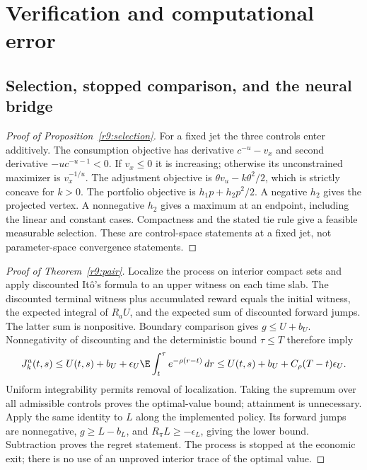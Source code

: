 \section{Verification and computational error}\label{r9:proof:verification}
\subsection{Selection, stopped comparison, and the neural bridge}
\begin{proof}[Proof of Proposition~\ref{r9:selection}]
For a fixed jet the three controls enter additively. The consumption objective has derivative $c^{-u}-v_x$ and second derivative $-uc^{-u-1}<0$. If $v_x\leq0$ it is increasing; otherwise its unconstrained maximizer is $v_x^{-1/u}$. The adjustment objective is $\theta v_u-k\theta^2/2$, which is strictly concave for $k>0$. The portfolio objective is $h_1p+h_2p^2/2$. A negative $h_2$ gives the projected vertex. A nonnegative $h_2$ gives a maximum at an endpoint, including the linear and constant cases. Compactness and the stated tie rule give a feasible measurable selection. These are control-space statements at a fixed jet, not parameter-space convergence statements.
\end{proof}

\begin{proof}[Proof of Theorem~\ref{r9:pair}]
Localize the process on interior compact sets and apply discounted It\^o's formula to an upper witness on each time slab. The discounted terminal witness plus accumulated reward equals the initial witness, the expected integral of $R_aU$, and the expected sum of discounted forward jumps. The latter sum is nonpositive. Boundary comparison gives $g\leq U+b_U$. Nonnegativity of discounting and the deterministic bound $\tau\leq T$ therefore imply
\[
 J_k^a(t,s)\leq U(t,s)+b_U+\epsilon_U\E\int_t^\tau e^{-\rho(r-t)}\,dr
 \leq U(t,s)+b_U+C_\rho(T-t)\epsilon_U.
\]
Uniform integrability permits removal of localization. Taking the supremum over all admissible controls proves the optimal-value bound; attainment is unnecessary. Apply the same identity to $L$ along the implemented policy. Its forward jumps are nonnegative, $g\geq L-b_L$, and $R_\pi L\geq-\epsilon_L$, giving the lower bound. Subtraction proves the regret statement. The process is stopped at the economic exit; there is no use of an unproved interior trace of the optimal value.
\end{proof}


